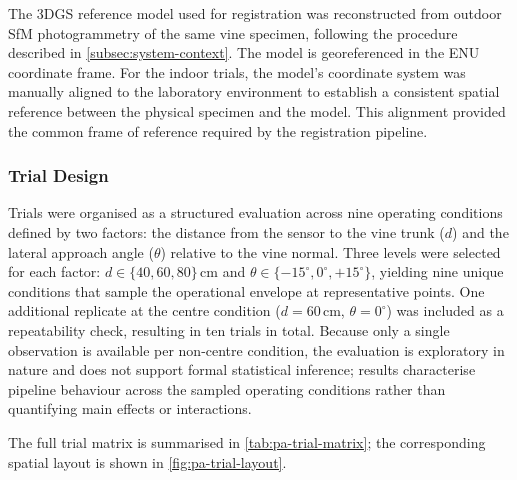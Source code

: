 The 3DGS reference model used for registration was reconstructed from outdoor SfM photogrammetry of the same vine specimen, following the procedure described in \cref{subsec:system-context}. The model is georeferenced in the ENU coordinate frame. For the indoor trials, the model's coordinate system was manually aligned to the laboratory environment to establish a consistent spatial reference between the physical specimen and the model. This alignment provided the common frame of reference required by the registration pipeline.

\subsubsection{Trial Design}
\label{subsubsec:pa-trial-design}

Trials were organised as a structured evaluation across nine operating conditions defined by two factors: the distance from the sensor to the vine trunk ($d$) and the lateral approach angle ($\theta$) relative to the vine normal. Three levels were selected for each factor: $d \in \{40, 60, 80\}$\,cm and $\theta \in \{-15^{\circ}, 0^{\circ}, {+}15^{\circ}\}$, yielding nine unique conditions that sample the operational envelope at representative points. One additional replicate at the centre condition ($d = 60$\,cm, $\theta = 0^{\circ}$) was included as a repeatability check, resulting in ten trials in total. Because only a single observation is available per non-centre condition, the evaluation is exploratory in nature and does not support formal statistical inference; results characterise pipeline behaviour across the sampled operating conditions rather than quantifying main effects or interactions.

The full trial matrix is summarised in \cref{tab:pa-trial-matrix}; the corresponding spatial layout is shown in \cref{fig:pa-trial-layout}.

